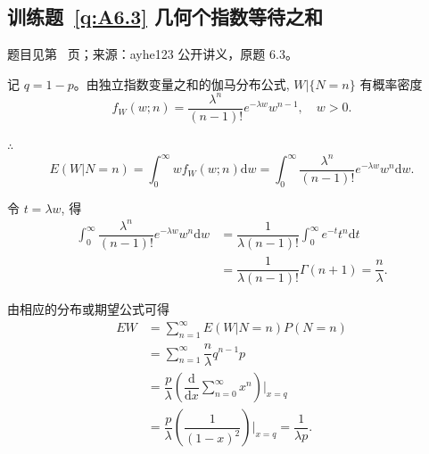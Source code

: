 \documentclass[UTF8,12pt,a4paper,fontset=fandol]{ctexbook}
\begin{document}
\subsection*{训练题~\ref{q:A6.3} 几何个指数等待之和}\label{a:A6.3}{\small 题目见第~\pageref{q:A6.3} 页；来源：ayhe123 公开讲义，原题 6.3。}
\begin{solve}
    记 $q=1-p$。由独立指数变量之和的伽马分布公式, $W|\{N=n\}$ 有概率密度
    \[f_W(w;n)=\dfrac{\lambda^n}{(n-1)!}e^{-\lambda w}w^{n-1},\quad w>0.\]

    $\therefore$
    \[E(W|N=n)=\int_0^\infty wf_W(w;n)\mathrm{d}w=\int_0^\infty\dfrac{\lambda^n}{(n-1)!}e^{-\lambda w}w^n\mathrm{d}w.\]

    令 $t=\lambda w$, 得
    \begin{align*}
        \int_0^\infty\dfrac{\lambda^n}{(n-1)!}e^{-\lambda w}w^n\mathrm{d}w & =\dfrac{1}{\lambda(n-1)!}\int_0^\infty e^{-t}t^n\mathrm{d}t \\
        & =\dfrac{1}{\lambda(n-1)!}\Gamma(n+1)=\dfrac{n}{\lambda}.
    \end{align*}

    由相应的分布或期望公式可得
    \begin{align*}
        EW & =\sum\limits_{n=1}^\infty E(W|N=n)P(N=n) \\
        & =\sum\limits_{n=1}^\infty\dfrac{n}{\lambda}q^{n-1}p \\
        & =\dfrac{p}{\lambda}\left(\dfrac{\mathrm{d}}{\mathrm{d}x}\sum\limits_{n=0}^\infty x^n\right)\Bigg|_{x=q} \\
        & =\dfrac{p}{\lambda}\left(\dfrac{1}{(1-x)^2}\right)\Bigg|_{x=q}=\dfrac{1}{\lambda p}.
    \end{align*}
\end{solve}
\end{document}
